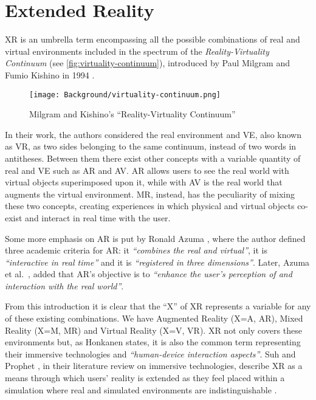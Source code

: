 \section{Extended Reality}
\label{sec:background-intro}

\gls{XR} is an umbrella term encompassing all the possible combinations of real and virtual environments included in the spectrum of the \emph{Reality-Virtuality Continuum} (see \autoref{fig:virtuality-continuum}), introduced by Paul Milgram and Fumio Kishino in 1994 \cite{milgram_taxonomy_1994}.

\begin{figure}[h]
	\centering
	\texttt{[image: Background/virtuality-continuum.png]}
	\caption{Milgram and Kishino's “Reality-Virtuality Continuum”}
	\label{fig:virtuality-continuum}
\end{figure}
In their work, the authors considered the real environment and \gls{VE}, also known as \gls{VR}, as two sides belonging to the same continuum, instead of two words in antitheses. Between them there exist other concepts with a variable quantity of real and VE such as \gls{AR} and AV. AR allows users to see the real world with virtual objects superimposed upon it, while with AV is the real world that augments the virtual environment. \gls{MR}, instead, has the peculiarity of mixing these two concepts, creating experiences in which physical and virtual objects co-exist and interact in real time with the user.

Some more emphasis on AR is put by Ronald Azuma \cite{azuma1997survey}, where the author defined three academic criteria for AR: it \textit{“combines the real and virtual”}, it is \textit{“interactive in real time”} and it is \textit{“registered in three dimensions”}. Later, Azuma et al.~\cite{azuma2001recent}, added that AR's objective is to \textit{“enhance the user’s perception of and interaction with the real world”}.

From this introduction it is clear that the “X” of XR represents a variable for any of these existing combinations. We have Augmented Reality (X=A, AR), Mixed Reality (X=M, MR) and Virtual Reality (X=V, VR). XR not only covers these environments but, as Honkanen \cite{honkanen_enhancing_2018} states, it is also the common term representing their immersive technologies and \textit{“human-device interaction aspects”}. Suh and Prophet \cite{suh_state_2018}, in their literature review on immersive technologies, describe XR as a means through which users' reality is extended as they feel placed within a simulation where real and simulated environments are indistinguishable \cite{kwok_covid-19_2020}.

